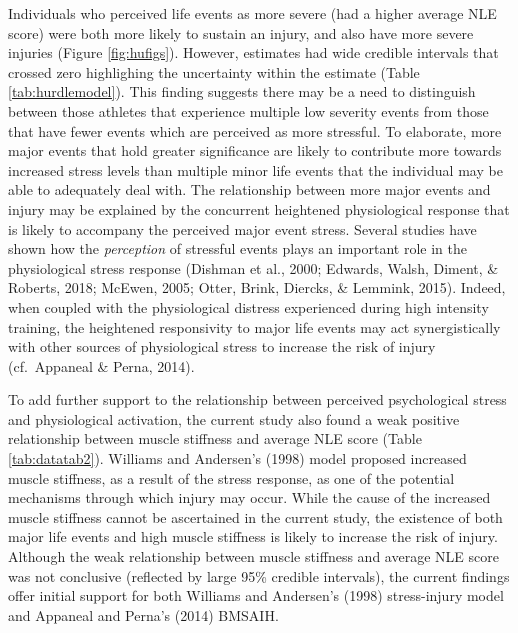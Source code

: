 \documentclass[
  english,
  man,floatsintext]{apa6}
\begin{document}
Individuals who perceived life events as more severe (had a higher average NLE score) were both more likely to sustain an injury, and also have more severe injuries (Figure \ref{fig:hufigs}).
However, estimates had wide credible intervals that crossed zero highlighing the uncertainty within the estimate (Table \ref{tab:hurdlemodel}).
This finding suggests there may be a need to distinguish between those athletes that experience multiple low severity events from those that have fewer events which are perceived as more stressful.
To elaborate, more major events that hold greater significance are likely to contribute more towards increased stress levels than multiple minor life events that the individual may be able to adequately deal with.
The relationship between more major events and injury may be explained by the concurrent heightened physiological response that is likely to accompany the perceived major event stress.
Several studies have shown how the \emph{perception} of stressful events plays an important role in the physiological stress response (Dishman et al., 2000; Edwards, Walsh, Diment, \& Roberts, 2018; McEwen, 2005; Otter, Brink, Diercks, \& Lemmink, 2015).
Indeed, when coupled with the physiological distress experienced during high intensity training, the heightened responsivity to major life events may act synergistically with other sources of physiological stress to increase the risk of injury (cf.~Appaneal \& Perna, 2014).

To add further support to the relationship between perceived psychological stress and physiological activation, the current study also found a weak positive relationship between muscle stiffness and average NLE score (Table \ref{tab:datatab2}).
Williams and Andersen's (1998) model proposed increased muscle stiffness, as a result of the stress response, as one of the potential mechanisms through which injury may occur.
While the cause of the increased muscle stiffness cannot be ascertained in the current study, the existence of both major life events and high muscle stiffness is likely to increase the risk of injury.
Although the weak relationship between muscle stiffness and average NLE score was not conclusive (reflected by large 95\% credible intervals), the current findings offer initial support for both Williams and Andersen's (1998) stress-injury model and Appaneal and Perna's (2014) BMSAIH.
\end{document}
